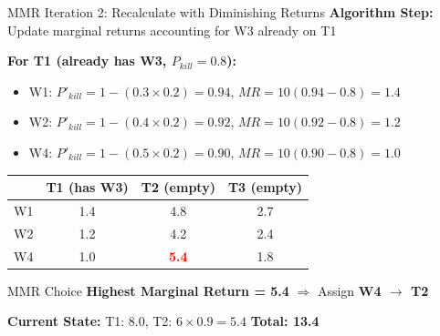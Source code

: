 \documentclass[aspectratio=43,8pt]{beamer}
\begin{document}
\begin{frame}{MMR Iteration 2: Recalculate with Diminishing Returns}
\textbf{Algorithm Step:} Update marginal returns accounting for W3 already on T1

\vspace{0.2cm}
\textbf{For T1 (already has W3, $P_{kill} = 0.8$):}
\begin{itemize}
    \item W1: $P'_{kill} = 1-(0.3 \times 0.2) = 0.94$, $MR = 10(0.94-0.8) = 1.4$
    \item W2: $P'_{kill} = 1-(0.4 \times 0.2) = 0.92$, $MR = 10(0.92-0.8) = 1.2$
    \item W4: $P'_{kill} = 1-(0.5 \times 0.2) = 0.90$, $MR = 10(0.90-0.8) = 1.0$
\end{itemize}

\vspace{0.2cm}
\begin{table}[h]
\centering
\begin{tabular}{c|ccc}
\toprule
     & T1 (has W3) & T2 (empty) & T3 (empty) \\ \midrule
W1 & 1.4 & 4.8 & 2.7 \\
W2 & 1.2 & 4.2 & 2.4 \\
W4 & 1.0 & \textcolor{red}{\textbf{5.4}} & 1.8 \\
\bottomrule
\end{tabular}
\end{table}

\begin{alertblock}{MMR Choice}
\textbf{Highest Marginal Return = 5.4} $\Rightarrow$ Assign \textbf{W4 $\rightarrow$ T2}
\end{alertblock}

\textbf{Current State:} T1: 8.0, T2: $6 \times 0.9 = 5.4$ \quad \textbf{Total: 13.4}
\end{frame}
\end{document}
